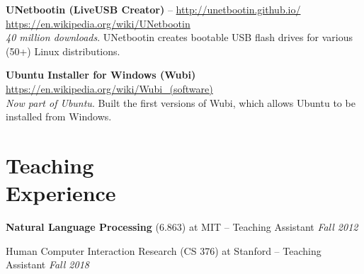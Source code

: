 \documentclass[margin,line]{resume}
\begin{document}
\begin{resume}
\textbf{UNetbootin (LiveUSB Creator)} -- \url{http://unetbootin.github.io/} \hfill \url{https://en.wikipedia.org/wiki/UNetbootin}\\ %
\emph{40 million downloads}. UNetbootin creates bootable USB flash drives for various (50+) Linux distributions.\\ %

\vspace{-6.5mm}

\textbf{Ubuntu Installer for Windows (Wubi)} \hfill \url{https://en.wikipedia.org/wiki/Wubi_(software)}\\ %
\emph{Now part of Ubuntu}. Built the first versions of Wubi, which allows Ubuntu to be installed from Windows. %


\section{\mysidestyle Teaching\\Experience}

\textbf{Natural Language Processing} (6.863) at MIT -- Teaching Assistant \hfill \textsl{Fall 2012} \\

\vspace{-8mm}

Human Computer Interaction Research (CS 376) at Stanford -- Teaching Assistant \hfill \textsl{Fall 2018} \\


\end{resume}
\end{document}
